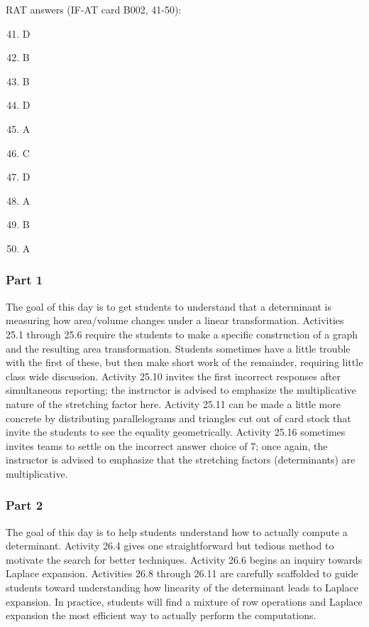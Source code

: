 \documentclass{article}
\begin{document}
RAT answers (IF-AT card B002, 41-50):
\begin{multicols}{10}
\begin{enumerate}[1)]
\setcounter{enumi}{40}
\item D
\item B
\item B
\item D
\item A
\item C
\item D
\item A
\item B
\item A
\end{enumerate}
\end{multicols}

\subsubsection*{Part 1}
The goal of this day is to get students to understand that a determinant is measuring how area/volume changes under a linear transformation.  Activities 25.1 through 25.6 require the students to make a specific construction of a graph and the resulting area transformation.  Students sometimes have a little trouble with the first of these, but then make short work of the remainder, requiring little class wide discussion.  Activity 25.10 invites the first incorrect responses after simultaneous reporting; the instructor is advised to emphasize the multiplicative nature of the stretching factor here.  Activity 25.11 can be made a little more concrete by distributing parallelograms and triangles cut out of card stock that invite the students to see the equality geometrically.  Activity 25.16 sometimes invites teams to settle on the incorrect answer choice of 7; once again, the instructor is advised to emphasize that the stretching factors (determinants) are multiplicative.

\subsubsection*{Part 2}
The goal of this day is to help students understand how to actually compute a determinant.  Activity 26.4 gives one straightforward but tedious method to motivate the search for better techniques.  Activity 26.6 begins an inquiry towards Laplace expansion.  Activities 26.8 through 26.11 are carefully scaffolded to guide students toward understanding how linearity of the determinant leads to Laplace expansion.  In practice, students will find a mixture of row operations and Laplace expansion the most efficient way to actually perform the computations.
\end{document}
